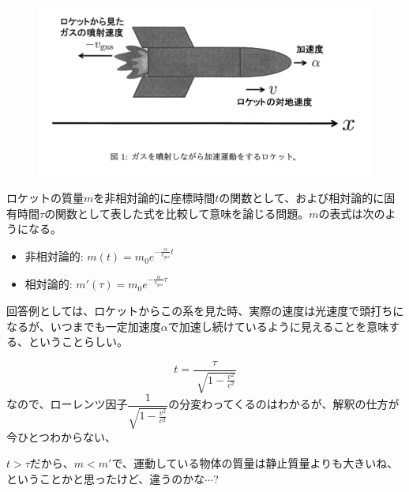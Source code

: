 \documentclass[10pt]{ltjsarticle}
\date{}
\begin{document}
\begin{figure}[hbt]
  \centering
  \includegraphics[width=0.6\linewidth,keepaspectratio]{./img/tokyoH28.png}
  \label{fig:rocket}
\end{figure}

  ロケットの質量$m$を非相対論的に座標時間$t$の関数として、および相対論的に固有時間$\tau$の関数として表した式を比較して意味を論じる問題。$m$の表式は次のようになる。
  \begin{itemize}
    \item 非相対論的: $m(t) = m_0 e^{-\frac{\alpha}{v_{gas}} t}$
    \item 相対論的: $m'(\tau) = m_0 e^{-\frac{\alpha}{v_{gas}} \tau}$
  \end{itemize}
  回答例としては、ロケットからこの系を見た時、実際の速度は光速度で頭打ちになるが、いつまでも一定加速度$\alpha$で加速し続けているように見えることを意味する、ということらしい。

  \begin{equation}
    t = \frac{\tau}{\sqrt[]{1 - \frac{v^2}{c^2}}}
  \end{equation}
  なので、ローレンツ因子$\dfrac{1}{\sqrt{1 - \frac{v^2}{c^2}}}$の分変わってくるのはわかるが、解釈の仕方が今ひとつわからない、

  $t > \tau$だから、$m < m'$で、運動している物体の質量は静止質量よりも大きいね、ということかと思ったけど、違うのかな$\cdots$?
\end{document}
